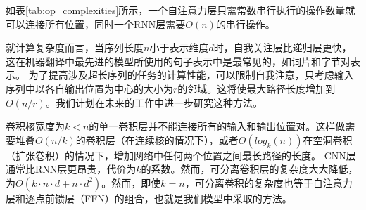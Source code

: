 如表\ref{tab:op_complexities}所示，一个自注意力层只需常数串行执行的操作数量就可以连接所有位置，同时一个RNN层需要$O(n)$的串行操作。


就计算复杂度而言，当序列长度$n$小于表示维度$d$时，自我关注层比递归层更快，这在机器翻译中最先进的模型所使用的句子表示中是最常见的，如词片\citep{wu2016google}和字节对\citep{sennrich2015neural}表示。
为了提高涉及超长序列的任务的计算性能，可以限制自我注意，只考虑输入序列中以各自输出位置为中心的大小为$r$的邻域。这将使最大路径长度增加到$O(n/r)$。我们计划在未来的工作中进一步研究这种方法。


卷积核宽度为$k<n$的单一卷积层并不能连接所有的输入和输出位置对。这样做需要堆叠$O(n/k)$的卷积层（在连续核的情况下），或者$O(log_k(n))$在空洞卷积（扩张卷积）\citep{NalBytenet2017}的情况下，增加网络中任何两个位置之间最长路径的长度。
CNN层通常比RNN层更昂贵，代价为$k$的系数。然而，可分离卷积层的复杂度大大降低，为$O(k\cdot n\cdot d + n\cdot d^2)$。然而，即使$k=n$，可分离卷积的复杂度也等于自注意力层和逐点前馈层（FFN）的组合，也就是我们模型中采取的方法。

